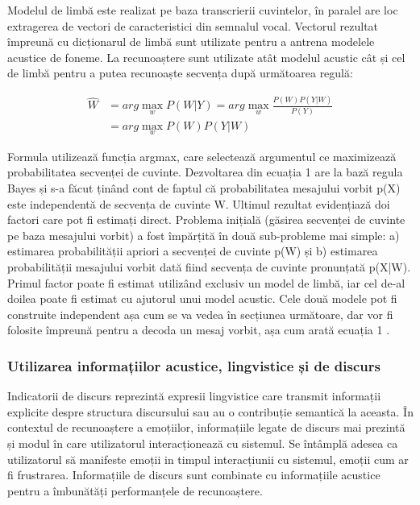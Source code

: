 \documentclass[9pt,shortpaper,twoside,web]{ieeecolor}
\begin{document}
Modelul de limbă este realizat pe baza transcrierii cuvintelor, în paralel are loc extragerea de vectori de caracteristici din semnalul vocal. Vectorul rezultat împreună cu dicționarul de limbă sunt utilizate pentru a antrena modelele acustice de foneme. La recunoaștere sunt utilizate atât modelul acustic cât și cel de limbă pentru a putea recunoaște secvența după următoarea regulă:

\begin{equation} \label{eq1}
\begin{split}
\hat{W} & =arg \max_{{w}} P(W|Y) = arg \max_{{w}} \frac{P(W)P(Y|W)}{P(Y)} \\
 & =  arg \max_{{w}} P(W)P(Y|W)
\end{split}
\end{equation}

Formula utilizează funcția argmax, care selectează argumentul ce maximizează probabilitatea secvenței de cuvinte. Dezvoltarea din ecuația 1 are la bază regula Bayes și s-a făcut ținând cont de faptul că probabilitatea mesajului vorbit p(X) este independentă de secvența de cuvinte W. Ultimul rezultat evidențiază doi factori care pot fi estimați direct. Problema inițială (găsirea secvenței de cuvinte pe baza mesajului vorbit) a fost împărțită în două sub-probleme mai simple: a) estimarea probabilității apriori a secvenței de cuvinte p(W) și b) estimarea probabilității mesajului vorbit dată fiind secvența de cuvinte pronunțată p(X|W). Primul factor poate fi estimat utilizând exclusiv un model de limbă, iar cel de-al doilea poate fi estimat cu ajutorul unui model acustic. Cele două modele pot fi construite independent așa cum se va vedea în secțiunea următoare, dar vor fi folosite împreună pentru a decoda un mesaj vorbit, așa cum arată ecuația 1 \cite{b3}.

\subsubsection{Utilizarea informațiilor acustice, lingvistice și de discurs}
Indicatorii de discurs reprezintă expresii lingvistice care transmit informații explicite despre structura discursului sau au o contribuție semantică la aceasta. În contextul de recunoaștere a emoțiilor, informațiile legate de discurs mai prezintă și modul în care utilizatorul interacționează cu sistemul. Se întâmplă adesea ca utilizatorul să manifeste emoții in timpul interacțiunii cu sistemul, emoții cum ar fi frustrarea. Informațiile de discurs sunt combinate cu informațiile acustice pentru a îmbunătăți performanțele de recunoaștere.
\end{document}
